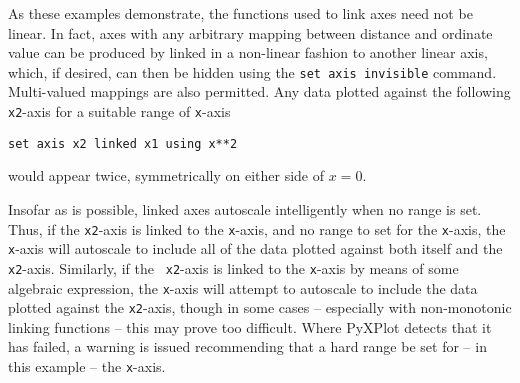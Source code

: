 As these examples demonstrate, the functions used to link axes need not be
linear. In fact, axes with any arbitrary mapping between distance and ordinate
value can be produced by linked in a non-linear fashion to another linear axis,
which, if desired, can then be hidden using the {\tt set axis invisible}
command. Multi-valued mappings are also permitted. Any data plotted against the
following {\tt x2}-axis for a suitable range of {\tt x}-axis
\begin{verbatim}
set axis x2 linked x1 using x**2
\end{verbatim}
would appear twice, symmetrically on either side of $x=0$.

Insofar as is possible, linked axes autoscale intelligently when no range is
set.  Thus, if the {\tt x2}-axis is linked to the {\tt x}-axis, and no range to
set for the {\tt x}-axis, the {\tt x}-axis will autoscale to include all of the
data plotted against both itself and the {\tt x2}-axis. Similarly, if the {\tt
x2}-axis is linked to the {\tt x}-axis by means of some algebraic expression,
the {\tt x}-axis will attempt to autoscale to include the data plotted against
the {\tt x2}-axis, though in some cases -- especially with non-monotonic
linking functions -- this may prove too difficult. Where PyXPlot detects that
it has failed, a warning is issued recommending that a hard range be set for --
in this example -- the {\tt x}-axis.

